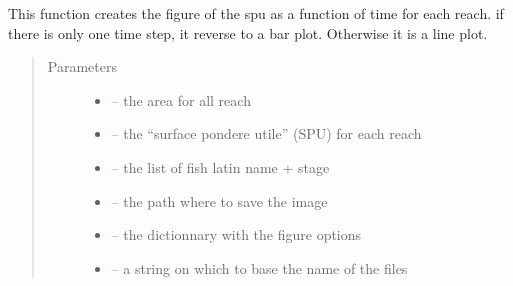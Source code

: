 \documentclass[letterpaper,10pt,english]{sphinxmanual}
\begin{document}
\begin{fulllineitems}
\label{\detokenize{index:src.calcul_hab.save_hab_fig_spu}}
This function creates the figure of the spu as a function of time for each reach. if there is only one
time step, it reverse to a bar plot. Otherwise it is a line plot.
\begin{quote}\begin{description}
\item[{Parameters}] \leavevmode\begin{itemize}
\item {} 
 -- the area for all reach

\item {} 
 -- the ``surface pondere utile'' (SPU) for each reach

\item {} 
 -- the list of fish latin name + stage

\item {} 
 -- the path where to save the image

\item {} 
 -- the dictionnary with the figure options

\item {} 
 -- a string on which to base the name of the files

\end{itemize}

\end{description}\end{quote}

\end{fulllineitems}

\end{document}
